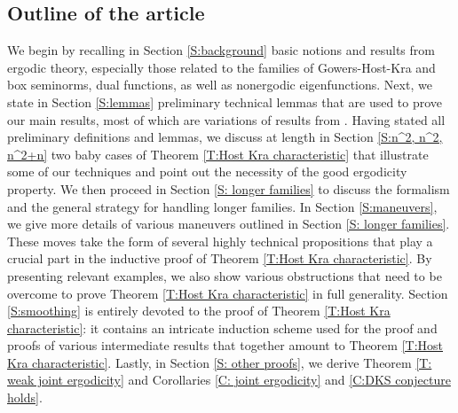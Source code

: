 \documentclass[11pt]{amsart}
\theoremstyle{definition}
\newcommand{\un}{{\underline{n}}}
\DeclareMathOperator{\Spec}{Spec}
\begin{document}

\subsection{Outline of the article}
We begin by recalling in Section \ref{S:background} basic notions and results from ergodic theory, especially those related to the families of Gowers-Host-Kra and box seminorms, dual functions, as well as nonergodic eigenfunctions. Next, we state in Section \ref{S:lemmas} preliminary technical lemmas that are used to prove our main results, most of which are variations of results from \cite{DFMKS21,Fr21, FrKu22}. Having stated all preliminary definitions and lemmas, we discuss at length in Section \ref{S:n^2, n^2, n^2+n} two baby cases of Theorem \ref{T:Host Kra characteristic} that illustrate some of our techniques and point out the necessity of the good ergodicity property. We then proceed in Section \ref{S: longer families} to discuss the formalism and the general strategy for handling longer families. In Section \ref{S:maneuvers}, we give more details of various maneuvers outlined in Section \ref{S: longer families}. These moves take the form of several highly technical propositions that play a crucial part in the inductive proof of Theorem \ref{T:Host Kra characteristic}. By presenting relevant examples, we also show various obstructions that need to be overcome to prove Theorem \ref{T:Host Kra characteristic} in full generality.  Section \ref{S:smoothing} is entirely devoted to the proof of Theorem \ref{T:Host Kra characteristic}: it contains an intricate induction scheme used for the proof and proofs of various intermediate results that together amount to Theorem \ref{T:Host Kra characteristic}. Lastly, in Section \ref{S: other proofs}, we derive Theorem \ref{T: weak joint ergodicity} and Corollaries \ref{C: joint ergodicity} and \ref{C:DKS conjecture holds}.
\end{document}
